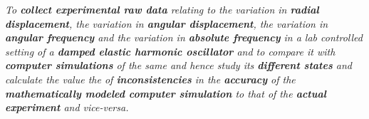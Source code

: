 \textit{To \textbf{collect experimental raw data} relating to the variation in \textbf{radial displacement}, the variation in \textbf{angular displacement}, the variation in \textbf{angular frequency} and the variation in \textbf{absolute frequency} in a lab controlled setting of a \textbf{damped elastic harmonic oscillator} and to compare it with \textbf{computer simulations} of the same and hence study its \textbf{different states} and calculate the value the of \textbf{inconsistencies} in the \textbf{accuracy} of the \textbf{mathematically modeled computer simulation} to that of the \textbf{actual experiment} and vice-versa.}
